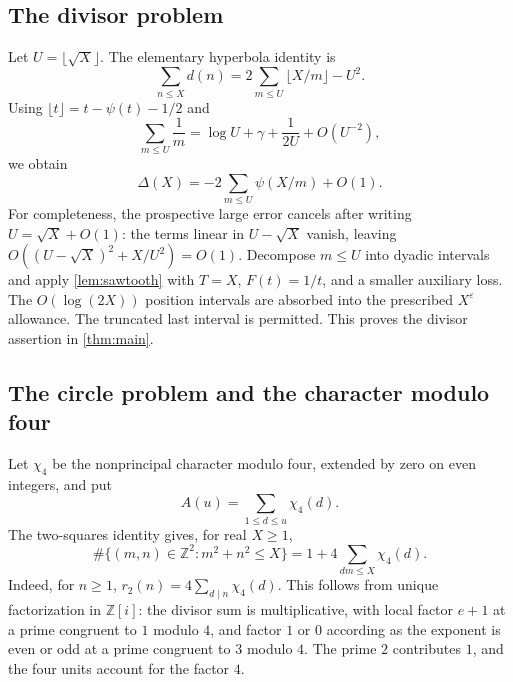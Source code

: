 \documentclass[11pt,reqno]{amsart}
\numberwithin{equation}{section}
\theoremstyle{definition}
\theoremstyle{remark}
\newcommand{\Z}{\mathbb Z}
\newcommand{\eps}{\varepsilon}
\begin{document}
\subsection{The divisor problem}
Let $U=\lfloor\sqrt X\rfloor$.
The elementary hyperbola identity is
\[
 \sum_{n\le X}d(n)=2\sum_{m\le U}\lfloor X/m\rfloor-U^2.
\]
Using $\lfloor t\rfloor=t-\psi(t)-1/2$ and
\[
 \sum_{m\le U}\frac1m=\log U+\gamma+\frac1{2U}+O(U^{-2}),
\]
we obtain
\begin{equation}\label{eq:divisorsawtooth}
 \Delta(X)=-2\sum_{m\le U}\psi(X/m)+O(1).
\end{equation}
For completeness, the prospective large error cancels after writing
$U=\sqrt X+O(1)$: the terms linear in $U-\sqrt X$ vanish, leaving
$O((U-\sqrt X)^2+X/U^2)=O(1)$.
Decompose $m\le U$ into dyadic intervals and apply \cref{lem:sawtooth} with $T=X$, $F(t)=1/t$, and a smaller auxiliary loss. The $O(\log(2X))$ position intervals are absorbed into the prescribed $X^\eps$ allowance. The truncated last interval is permitted.
This proves the divisor assertion in \cref{thm:main}.

\subsection{The circle problem and the character modulo four}
Let $\chi_4$ be the nonprincipal character modulo four, extended by zero on even integers, and put
\[
 A(u)=\sum_{1\le d\le u}\chi_4(d).
\]
The two-squares identity gives, for real $X\ge1$,
\begin{equation}\label{eq:twosquares}
 \#\{(m,n)\in\Z^2:m^2+n^2\le X\}
 =1+4\sum_{dm\le X}\chi_4(d).
\end{equation}
Indeed, for $n\ge1$, $r_2(n)=4\sum_{d\mid n}\chi_4(d)$.
This follows from unique factorization in $\Z[i]$: the divisor sum is multiplicative, with local factor $e+1$ at a prime congruent to $1$ modulo $4$, and factor $1$ or $0$ according as the exponent is even or odd at a prime congruent to $3$ modulo $4$.
The prime $2$ contributes $1$, and the four units account for the factor $4$.
\end{document}
